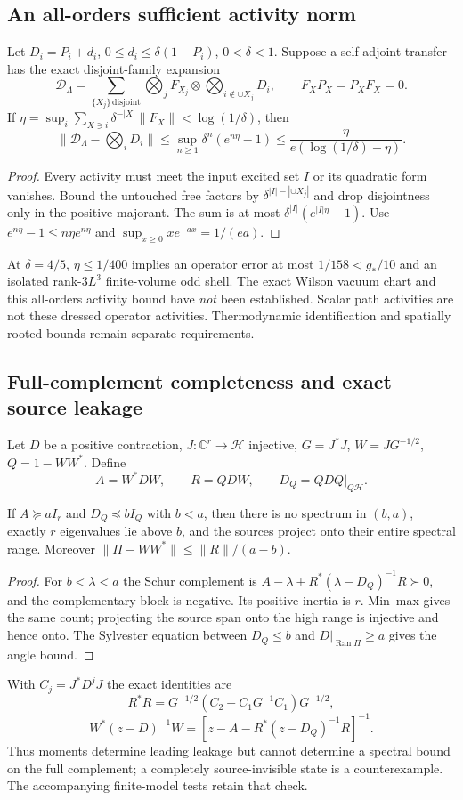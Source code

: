 \subsection{An all-orders sufficient activity norm}
\begin{theorem}
Let $D_i=P_i+d_i$, $0\le d_i\le\delta(1-P_i)$, $0<\delta<1$.
Suppose a self-adjoint transfer has the exact disjoint-family expansion
\[
 \mathcal D_\Lambda=
 \sum_{\{X_j\}\,\mathrm{disjoint}}
 \bigotimes_jF_{X_j}\otimes\bigotimes_{i\notin\cup X_j}D_i,
 \qquad F_XP_X=P_XF_X=0.
\]
If $\eta=\sup_i\sum_{X\ni i}\delta^{-|X|}\|F_X\|<\log(1/\delta)$, then
\[
 \|\mathcal D_\Lambda-\bigotimes_iD_i\|
 \le\sup_{n\ge1}\delta^n(e^{n\eta}-1)
 \le\frac{\eta}{e(\log(1/\delta)-\eta)}.
\]
\end{theorem}
\begin{proof}
Every activity must meet the input excited set $I$ or its quadratic form
vanishes. Bound the untouched free factors by
$\delta^{|I|-|\cup X_j|}$ and drop disjointness only in the positive
majorant. The sum is at most $\delta^{|I|}(e^{|I|\eta}-1)$.
Use $e^{n\eta}-1\le n\eta e^{n\eta}$ and
$\sup_{x\ge0}xe^{-ax}=1/(ea)$.
\end{proof}
At $\delta=4/5$, $\eta\le1/400$ implies an operator error at most
$1/158<g_*/10$ and an isolated rank-$3L^3$ finite-volume odd shell.
The exact Wilson vacuum chart and this all-orders activity bound have
\emph{not} been established. Scalar path activities are not these dressed
operator activities. Thermodynamic identification and spatially rooted
bounds remain separate requirements.

\subsection{Full-complement completeness and exact source leakage}
Let $D$ be a positive contraction, $J:\mathbb C^r\to\mathcal H$ injective,
$G=J^*J$, $W=JG^{-1/2}$, $Q=1-WW^*$. Define
\[
 A=W^*DW,\qquad R=QDW,\qquad D_Q=QDQ|_{Q\mathcal H}.
\]
\begin{theorem}
If $A\succeq aI_r$ and $D_Q\preceq bI_Q$ with $b<a$, then there is no
spectrum in $(b,a)$, exactly $r$ eigenvalues lie above $b$, and the sources
project onto their entire spectral range. Moreover
$\|\Pi-WW^*\|\le\|R\|/(a-b)$.
\end{theorem}
\begin{proof}
For $b<\lambda<a$ the Schur complement is
$A-\lambda+R^*(\lambda-D_Q)^{-1}R\succ0$, and the complementary block is
negative. Its positive inertia is $r$. Min--max gives the same count;
projecting the source span onto the high range is injective and hence onto.
The Sylvester equation between $D_Q\le b$ and $D|_{\operatorname{Ran}\Pi}\ge a$
gives the angle bound.
\end{proof}
With $C_j=J^*D^jJ$ the exact identities are
\[
 R^*R=G^{-1/2}(C_2-C_1G^{-1}C_1)G^{-1/2},
\]
\[
 W^*(z-D)^{-1}W=[z-A-R^*(z-D_Q)^{-1}R]^{-1}.
\]
Thus moments determine leading leakage but cannot determine a spectral
bound on the full complement; a completely source-invisible state is a
counterexample. The accompanying finite-model tests retain that check.
